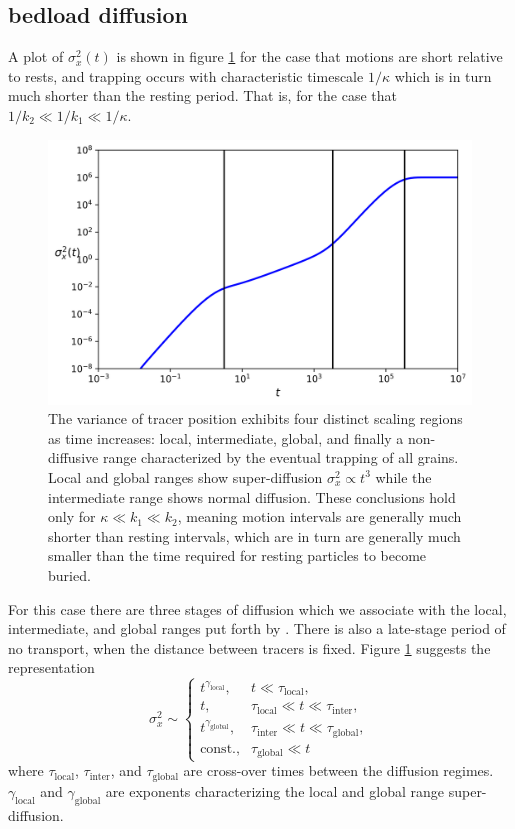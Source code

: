 \documentclass[]{agujournal2018}
\newcommand\be{\begin{equation}}
\newcommand\ee{\end{equation}}
\begin{document}
\subsection{bedload diffusion}
A plot of $\sigma_x^2(t)$ is shown in figure \ref{fig:var} for the case that motions are short relative to rests, and trapping occurs with characteristic timescale $1/\kappa$ which is in turn much shorter than the resting period.
That is, for the case that $1/k_2 \ll 1/k_1 \ll 1/\kappa$.
\begin{figure}[t]
	\includegraphics[width=\linewidth,keepaspectratio]{./figures/diffusion.png}
	\caption{The variance of tracer position exhibits four distinct scaling regions as time increases: local, intermediate, global, and finally a non-diffusive range characterized by the eventual trapping of all grains.
	Local and global ranges show super-diffusion $\sigma_x^2 \propto t^3$ while the intermediate range shows normal diffusion. These conclusions hold only for $\kappa \ll k_1 \ll k_2$, meaning motion intervals are generally much shorter than resting intervals, which are in turn are generally much smaller than the time required for resting particles to become buried.}
	\label{fig:var}
\end{figure}
For this case there are three stages of diffusion which we associate with the local, intermediate, and global ranges put forth by \citet{Nikora2001a}. There is also a late-stage period of no transport, when the distance between tracers is fixed.
Figure \ref{fig:var} suggests the representation
\be \sigma_x^2 \sim
\begin{cases}
t^{\gamma_\text{local}}, & t\ll \tau_\text{local},\\
t, & \tau_\text{local} \ll t \ll \tau_\text{inter}, \\
t^{\gamma_\text{global}}, & \tau_\text{inter} \ll t \ll \tau_\text{global}, \\
\text{const.}, & \tau_\text{global} \ll  t
\end{cases}\ee
where $\tau_\text{local}$, $\tau_\text{inter}$, and $\tau_\text{global}$ are cross-over times between the diffusion regimes.
$\gamma_\text{local}$ and $\gamma_\text{global}$ are exponents characterizing the local and global range super-diffusion.
\end{document}
